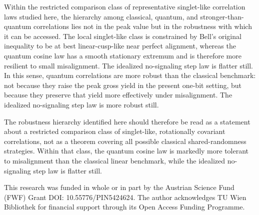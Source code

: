 \documentclass[pra,twocolumn,showpacs,preprintnumbers,amsmath,amssymb,longbibliography,
               superscriptaddress]{revtex4-2}
\begin{document}
{Within the restricted comparison class of representative singlet-like
correlation laws studied here, the hierarchy among classical, quantum,
and stronger-than-quantum correlations lies not in the peak value but in
the robustness with which it can be accessed.
The local singlet-like class is constrained by Bell's original
inequality to be at best linear-cusp-like near perfect alignment,
whereas the quantum cosine law has a smooth stationary extremum and is
therefore more resilient to small misalignment.
The idealized no-signaling step law is flatter still.
In this sense, quantum correlations are more robust than the classical
benchmark: not because they raise the peak gross yield in the present
one-bit setting, but because they preserve that yield more effectively
under misalignment. The idealized no-signaling step law is more robust
still.}

{The robustness hierarchy identified here should therefore be read as a
statement about a restricted comparison class of singlet-like,
rotationally covariant correlations, not as a theorem covering all
possible classical shared-randomness strategies.
Within that class, the quantum cosine law is markedly more tolerant to
misalignment than the classical linear benchmark, while the idealized
no-signaling step law is flatter still.}

\begin{acknowledgments}
This research was funded in whole or in part by the Austrian Science Fund (FWF) Grant DOI: 10.55776/PIN5424624. The author acknowledges TU Wien Bibliothek for financial support through its Open Access Funding Programme.
\end{acknowledgments}


\end{document}
